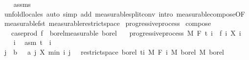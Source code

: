 \begin{isabellebody}
%
\isadelimproof
\ \ %
\endisadelimproof
%
\isatagproof
{}\isamarkupfalse%
\ assms\ \isamarkupfalse%
\ {\isacharparenleft}{\kern0pt}unfold{\isacharunderscore}{\kern0pt}locales{\isacharparenright}{\kern0pt}\ {\isacharparenleft}{\kern0pt}auto\ simp\ add{\isacharcolon}{\kern0pt}\ measurable{\isacharunderscore}{\kern0pt}split{\isacharunderscore}{\kern0pt}conv\ intro{\isacharbang}{\kern0pt}{\isacharcolon}{\kern0pt}\ measurable{\isacharunderscore}{\kern0pt}compose{\isacharbrackleft}{\kern0pt}OF\ measurable{\isacharunderscore}{\kern0pt}fst{\isacharbrackright}{\kern0pt}\ measurable{\isacharunderscore}{\kern0pt}restrict{\isacharunderscore}{\kern0pt}space{}{\isacharparenright}{\kern0pt}%
\endisatagproof
{\isafoldproof}%
%
\isadelimproof
\isanewline
%
\endisadelimproof
\isanewline
{}\isamarkupfalse%
\ progressive{\isacharunderscore}{\kern0pt}process\isanewline
{}\isanewline
\isanewline
{}\isamarkupfalse%
\ compose{\isacharcolon}{\kern0pt}\isanewline
\ \ \ {\isachardoublequoteopen}case{\isacharunderscore}{\kern0pt}prod\ f\ {\isasymin}\ borel{\isacharunderscore}{\kern0pt}measurable\ borel{\isachardoublequoteclose}\isanewline
\ \ \ {\isachardoublequoteopen}progressive{\isacharunderscore}{\kern0pt}process\ M\ F\ t\ {\isacharparenleft}{\kern0pt}{\isasymlambda}i\ {\isasymxi}{\isachardot}{\kern0pt}\ {\isacharparenleft}{\kern0pt}f\ i{\isacharparenright}{\kern0pt}\ {\isacharparenleft}{\kern0pt}X\ i\ {\isasymxi}{\isacharparenright}{\kern0pt}{\isacharparenright}{\kern0pt}{\isachardoublequoteclose}\isanewline
%
\isadelimproof
%
\endisadelimproof
%
\isatagproof
{}\isamarkupfalse%
\isanewline
\ \ \isamarkupfalse%
\ i\ \isamarkupfalse%
\ asm{\isacharcolon}{\kern0pt}\ {\isachardoublequoteopen}t\ {\isasymle}\ i{\isachardoublequoteclose}\isanewline
\ \ \isamarkupfalse%
\ {\isachardoublequoteopen}{\isacharparenleft}{\kern0pt}{\isasymlambda}{\isacharparenleft}{\kern0pt}j\ {\isacharcolon}{\kern0pt}{\isacharcolon}{\kern0pt}\ {\isacharprime}{\kern0pt}b{\isacharcomma}{\kern0pt}\ {\isasymxi}\ {\isacharcolon}{\kern0pt}{\isacharcolon}{\kern0pt}\ {\isacharprime}{\kern0pt}a{\isacharparenright}{\kern0pt}{\isachardot}{\kern0pt}\ {\isacharparenleft}{\kern0pt}j{\isacharcomma}{\kern0pt}\ X\ {\isacharparenleft}{\kern0pt}min\ i\ j{\isacharparenright}{\kern0pt}\ {\isasymxi}{\isacharparenright}{\kern0pt}{\isacharparenright}{\kern0pt}\ {\isasymin}\ {\isacharparenleft}{\kern0pt}restrict{\isacharunderscore}{\kern0pt}space\ borel\ {\isacharbraceleft}{\kern0pt}ti{\isacharbraceright}{\kern0pt}\ {\isasymOtimes}\isactrlsub M\ F\ i{\isacharparenright}{\kern0pt}\ {\isasymrightarrow}\isactrlsub M\ borel\ {\isasymOtimes}\isactrlsub M\ borel{\isachardoublequoteclose}\ \isamarkupfalse%

\end{isabellebody}
